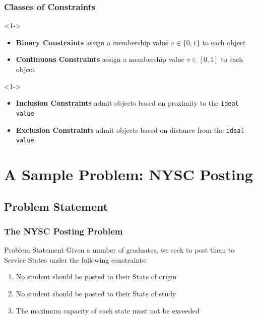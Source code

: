 \documentclass[10pt]{beamer}
\begin{document}
			\begin{frame}
				\frametitle{Classes of Constraints}
				\vfill
				\begin{definition}<1->
					\begin{itemize}
						\item \textbf{Binary Constraints} assign a membership value $v \in \{0,1\}$ to each object
						\item \textbf{Continuous Constraints} assign a membership value $v \in [0,1]$ to each object
					\end{itemize}
				\end{definition}
				\begin{definition}<1->
					\begin{itemize}
						\item \textbf{Inclusion Constraints} admit objects based on proximity to the \texttt{ideal value}
						\item \textbf{Exclusion Constraints} admit objects based on distance from the \texttt{ideal value}
					\end{itemize}
				\end{definition}
			\end{frame}

	\section{A Sample Problem: NYSC Posting}
		\subsection{Problem Statement}
			\begin{frame}
				\frametitle{The NYSC Posting Problem}
				\begin{block}{Problem Statement}
					Given a number of graduates, we seek to post them to Service States under the following constraints:
					\begin{enumerate}
						\item No student should be posted to their State of origin
						\item No student should be posted to their State of study
						\item The maximum capacity of each state must not be exceeded%
					\end{enumerate}
				\end{block}		
			\end{frame}
\end{document}
